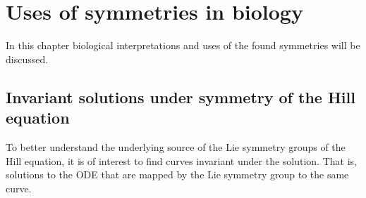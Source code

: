 \chapter{Uses of symmetries in biology}

In this chapter biological interpretations and uses of the found symmetries will be discussed.

\section{Invariant solutions under symmetry of the Hill equation}

To better understand the underlying source of the Lie symmetry groups of the Hill equation, it is of interest to find curves invariant under the solution.
That is, solutions to the ODE that are mapped by the Lie symmetry group to the same curve.

